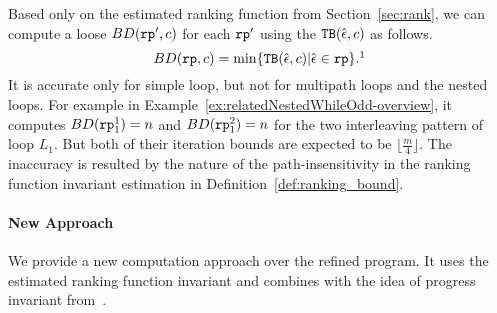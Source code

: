 Based only on the estimated ranking function from Section~\ref{sec:rank}, we can compute a loose $BD(\mathtt{rp}', c)$ for each $\mathtt{rp}'$
using the ${\mathtt{TB}}(\hat{\mathtt{\epsilon}{}}, c)$ as follows.
\begin{equation}
  \label{eq:absBD}
  BD(\rprog, c) = \min\left\{ \absclr(\absevent, c) \middle\vert \absevent \in \rprog \right\}.\footnotemark
\end{equation}
%
It is accurate only for simple loop, but not for multipath loops and the nested loops.
For example in Example~\ref{ex:relatedNestedWhileOdd-overview},
it computes $BD(\mathtt{rp}_1^1) = n$ and $BD(\mathtt{rp}_1^2) = n $ for the two interleaving pattern of loop $L_1$.
But both of their iteration bounds are expected to be $\lfloor\frac{m}{4}\rfloor$.
The inaccuracy is resulted by the nature of the path-insensitivity in the ranking function invariant estimation in Definition~\ref{def:ranking_bound}. 

\paragraph{New Approach} 
We provide a new computation approach over the refined program.
It uses the estimated ranking function invariant and combines with the idea of progress invariant from~\cite{GulwaniJK09}.

